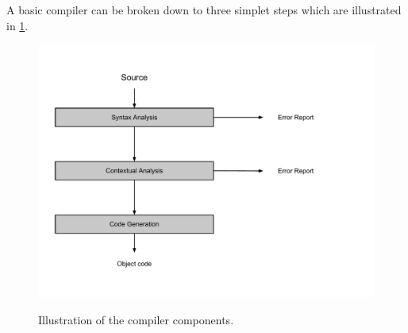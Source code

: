 A basic compiler can be broken down to three simplet steps which are illustrated in \ref{fig:compiler}.

\begin{figure}[H]
\begin{center}
\includegraphics[scale=0.6]{Compiler_Components/compiler_drawing.pdf}
\label{fig:compiler}
\caption{Illustration of the compiler components.}
\end{center}
\end{figure}